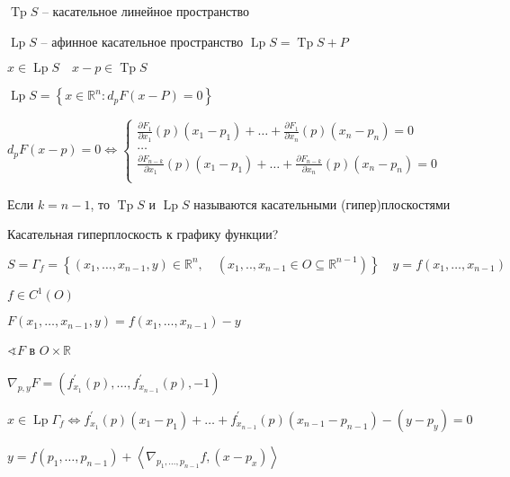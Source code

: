 \documentclass{book}
\newcommand\R{\ensuremath{\mathbb{R}}}
\newcommand{\p}[1]{#1^{\prime}}
\theoremstyle{definition}
\DeclareMathOperator{\Tp}{Tp}
\DeclareMathOperator{\Lp}{Lp}
\begin{document}
 $\Tp S$ -- касательное линейное пространство

  $\Lp S$ -- афинное касательное пространство  $\Lp S = \Tp S + P$

   $x\in \Lp S\quad x - p\in \Tp S$

   $\Lp S = \left\{ x\in \R^n: d_pF(x-P) = 0 \right\} $ 

   $d_pF(x-p) = 0 \iff \begin{cases}
       \frac{\partial F_1}{\partial x_1}(p)(x_1-p_1) + \ldots + \frac{\partial F_1}{\partial x_{n} }(p)(x_{n} -p_n) = 0\\
       \ldots\\
       \frac{\partial F_{n-k}}{\partial x_1}(p)(x_1-p_1) + \ldots + \frac{\partial F_{n-k}}{\partial x_{n} }(p)(x_{n} -p_n) = 0\\
   \end{cases}$ 

   Если $k = n-1$, то  $\Tp S$ и  $\Lp S$ называются касательными (гипер)плоскостями

   Касательная гиперплоскость к графику функции?

   $S = \Gamma_f = \left\{ \left( x_1, \ldots, x_{n-1}, y \right) \in \R^n, \quad \left( x_1, .., x_{n-1}\in O \subseteq \R^{n-1} \right)  \right\} \quad y = f\left( x_1, \ldots, x_{n-1} \right) $ 

   $f\in C^1(O)$

   $F\left( x_1, \ldots, x_{n-1}, y \right)  = f\left( x_1, \ldots, x_{n-1} \right)  - y$

   $\sphericalangle F$ в $O\times \R$

   $\nabla_{p,y}F = \left( \p f_{x_1}(p), \ldots, \p f_{x_{n-1}}(p), -1 \right) $ 

   $x\in \Lp \Gamma_f \iff \p f_{x_1}(p)(x_1-p_1) + \ldots + \p f_{x_{n-1}}(p)(x_{n-1}-p_{n-1}) - \left( y - p_y \right)  = 0$

   $y = f\left( p_1, \ldots, p_{n-1} \right)  + \left<\nabla _{p_1, \ldots, p_{n-1}}f, (x-p_x) \right>$
\end{document}
